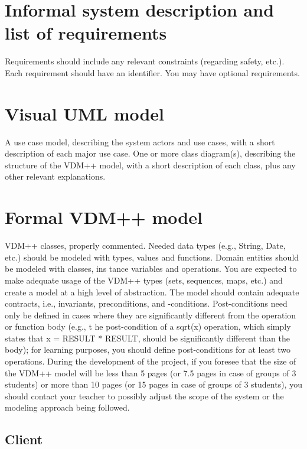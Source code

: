 \documentclass[a4paper]{article}
\begin{document}

\newpage
\tableofcontents
\newpage

\section{Informal system description and list of requirements}
Requirements should include any relevant constraints (regarding safety, etc.). 
Each requirement should have an identifier. 
You may have optional requirements. 
\section{Visual UML model}
A use case model, describing the system actors and 
use cases, with a short description 
of each major use case. 
One or more class diagram(s), describing the structure of the VDM++ model, with a 
short description of each class, plus any other relevant explanations. 
\section{Formal VDM++ model}
VDM++ classes, properly commented. 
Needed data types (e.g., String, Date, etc.) should be modeled with types, values and 
functions. 
Domain entities should be modeled with classes, ins
tance variables and operations. 
You are expected to make adequate usage of the VDM++ types (sets, sequences, maps, etc.) and create a model at a high level of abstraction. 
The model should contain adequate contracts, i.e., 
invariants, preconditions, and -conditions. Post-conditions need only be defined in cases where they are significantly different from the operation or function body (e.g., t
he post-condition of a sqrt(x) operation, which simply states that x = RESULT * RESULT, should be significantly different than the body); for learning purposes, you should define post-conditions for at least two operations. 
During the development of the project, if you foresee that the size of the VDM++ model 
will be less than 5 pages (or 7.5 pages in case of 
groups of 3 students) or more than 10 
pages (or 15 pages in case of groups of 3 students), you should contact your teacher to 
possibly adjust the scope of the system or the modeling approach being followed. 
\subsection{Client}

\end{document}
